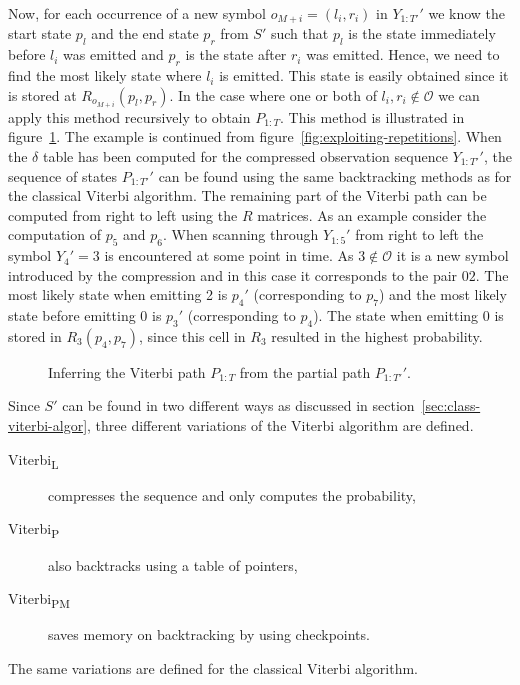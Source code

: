 Now, for each occurrence of a new symbol $o_{M + i} = (l_i, r_i)$ in
$Y_{1:T'}'$ we know the start state $p_l$ and the end state $p_r$ from $S'$
such that $p_l$ is the state immediately before $l_i$ was emitted and $p_r$ is
the state after $r_i$ was emitted. Hence, we need to find the most likely state
where $l_i$ is emitted. This state is easily obtained since it is stored at
$R_{o_{M + i}}(p_l, p_r)$. In the case where one or both of
$l_i, r_i \not \in \mathcal{O}$ we can apply this method recursively to obtain
$P_{1:T}$. This method is illustrated in
figure~\ref{fig:infering-viterbi-path}. The example is continued from
figure~\ref{fig:exploiting-repetitions}. When the $\delta$ table has been
computed for the compressed observation sequence $Y_{1:T'}'$, the sequence of
states $P_{1:T'}'$ can be found using the same backtracking methods as for the
classical Viterbi algorithm. The remaining part of the Viterbi path can be
computed from right to left using the $R$ matrices. As an example consider the
computation of $p_5$ and $p_6$. When scanning through $Y_{1:5}'$ from right to
left the symbol $Y_4' = 3$ is encountered at some point in time. As
$3 \not \in \mathcal{O}$ it is a new symbol introduced by the compression and
in this case it corresponds to the pair $02$. The most likely state when
emitting 2 is $p_4'$ (corresponding to $p_7$) and the most likely state before
emitting 0 is $p_3'$ (corresponding to $p_4$). The state when emitting 0 is
stored in $R_3(p_4, p_7)$, since this cell in $R_3$ resulted in the highest
probability.

\begin{figure}
  \centering
  
  \caption{Inferring the Viterbi path $P_{1:T}$ from the partial path
    $P_{1:T'}'$. }
  \label{fig:infering-viterbi-path}
\end{figure}

Since $S'$ can be found in two different ways as discussed in
section~\ref{sec:class-viterbi-algor}, three different variations of the Viterbi
algorithm are defined.
\begin{description}
\item[Viterbi\textsubscript{L}] compresses the sequence and only computes the
  probability,
\item[Viterbi\textsubscript{P}] also backtracks using a table of pointers,
\item[Viterbi\textsubscript{PM}] saves memory on backtracking by using checkpoints.
\end{description}
The same variations are defined for the classical Viterbi algorithm.


